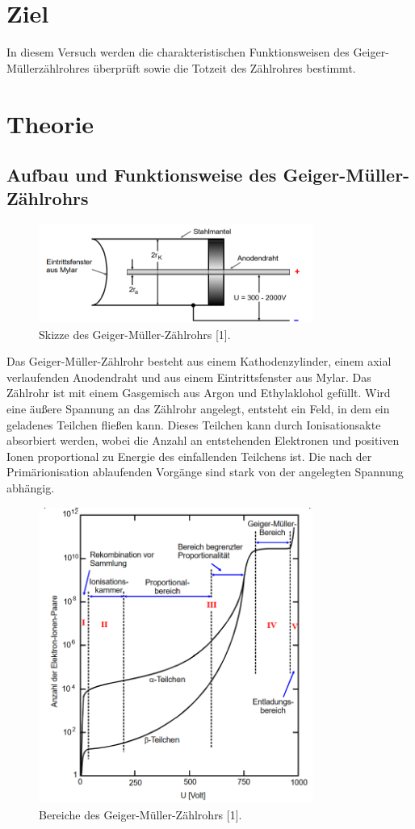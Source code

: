\section{Ziel}
In diesem Versuch werden die charakteristischen Funktionsweisen des Geiger-Müllerzählrohres überprüft sowie die Totzeit des Zählrohres bestimmt.

\section{Theorie}
\subsection{Aufbau und Funktionsweise des Geiger-Müller-Zählrohrs}
\begin{figure}[H] 
  \centering 
  \includegraphics[width=9cm]{content/1.png} 
  \caption{Skizze des Geiger-Müller-Zählrohrs [1].} \label{fig:1} 
\end{figure}
Das Geiger-Müller-Zählrohr besteht aus einem Kathodenzylinder, einem axial verlaufenden Anodendraht und aus einem Eintrittsfenster aus Mylar. Das Zählrohr ist mit einem Gasgemisch aus Argon und Ethylaklohol gefüllt. Wird eine äußere Spannung an das Zählrohr angelegt, entsteht ein Feld, in dem ein geladenes Teilchen fließen kann. Dieses Teilchen kann durch Ionisationsakte absorbiert werden, wobei die Anzahl an entstehenden Elektronen und positiven Ionen proportional zu Energie des einfallenden Teilchens ist. Die nach der Primärionisation ablaufenden Vorgänge sind stark von der angelegten Spannung abhängig.\\
\begin{figure}[H] 
  \centering 
  \includegraphics[width=9cm]{content/2.png} 
  \caption{Bereiche des Geiger-Müller-Zählrohrs [1].} \label{fig:2} 
\end{figure}

